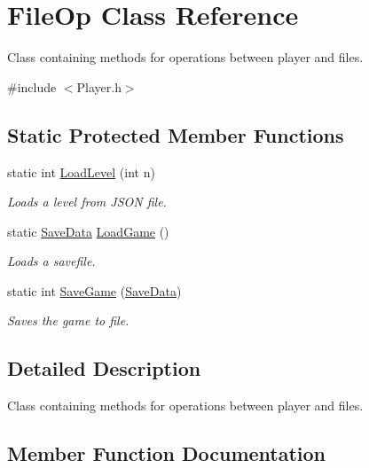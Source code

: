 \hypertarget{class_file_op}{}\section{File\+Op Class Reference}
\label{class_file_op}


Class containing methods for operations between player and files.  




{\ttfamily \#include $<$Player.\+h$>$}

\subsection*{Static Protected Member Functions}
\begin{DoxyCompactItemize}
\item 
static int \hyperlink{class_file_op_ad0b6c298ae4ba9a9e17c70b432977bcc}{Load\+Level} (int n)
\begin{DoxyCompactList}\small\item\em Loads a level from J\+S\+ON file. \end{DoxyCompactList}\item 
\mbox{\label{class_file_op_a7e8d42a9a08831340f0c26bd641153e2}} 
static \hyperlink{struct_save_data}{Save\+Data} \hyperlink{class_file_op_a7e8d42a9a08831340f0c26bd641153e2}{Load\+Game} ()
\begin{DoxyCompactList}\small\item\em Loads a savefile. \end{DoxyCompactList}\item 
\mbox{\label{class_file_op_a727f9a9fd9700f753afeda9c0d1e04d8}} 
static int \hyperlink{class_file_op_a727f9a9fd9700f753afeda9c0d1e04d8}{Save\+Game} (\hyperlink{struct_save_data}{Save\+Data})
\begin{DoxyCompactList}\small\item\em Saves the game to file. \end{DoxyCompactList}\end{DoxyCompactItemize}


\subsection{Detailed Description}
Class containing methods for operations between player and files. 

\subsection{Member Function Documentation}
\mbox{\label{class_file_op_ad0b6c298ae4ba9a9e17c70b432977bcc}} 
